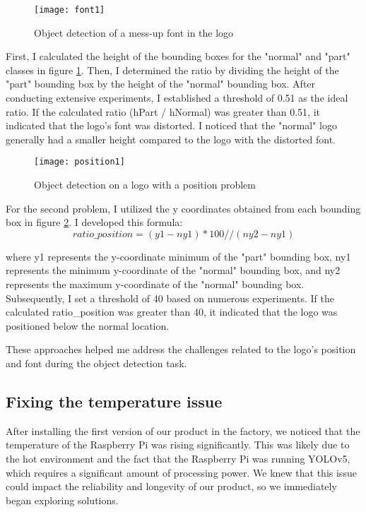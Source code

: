 \begin{figure}[htbp]
    \centering
    
    \begin{minipage}{1\textwidth}
        \centering
        \texttt{[image: font1]}
        \caption{Object detection of a mess-up font in the logo}
        \label{fig:image4}
    \end{minipage}
\end{figure}
\FloatBarrier 
 First, I calculated the height of the bounding boxes for the "normal" and "part" classes in figure \ref{fig:image4}. Then, I determined the ratio by dividing the height of the "part" bounding box by the height of the "normal" bounding box. After conducting extensive experiments, I established a threshold of 0.51 as the ideal ratio. If the calculated ratio (hPart / hNormal) was greater than 0.51, it indicated that the logo's font was distorted. I noticed that the "normal" logo generally had a smaller height compared to the logo with the distorted font.
\FloatBarrier
\begin{figure}[htbp]
    \centering
    
    \begin{minipage}{1\textwidth}
        \centering
        \texttt{[image: position1]}
        \caption{Object detection on a logo with a position problem}
        \label{fig:image5}
    \end{minipage}
\end{figure}
\FloatBarrier
For the second problem, I utilized the y coordinates obtained from each bounding box  in figure \ref{fig:image5}. I developed this formula:
\begin{equation}
ratio\_position = (y1 - ny1) * 100 // (ny2 - ny1)
\end{equation}

 where y1 represents the y-coordinate minimum of the "part" bounding box, ny1 represents the minimum y-coordinate of the "normal" bounding box, and ny2 represents the maximum y-coordinate of the "normal" bounding box. Subsequently, I set a threshold of 40 based on numerous experiments. If the calculated ratio\_position was greater than 40, it indicated that the logo was positioned below the normal location.

These approaches helped me address the challenges related to the logo's position and font during the object detection task.
\subsection{Fixing the temperature issue}
After installing the first version of our product in the factory, we noticed that the temperature of the Raspberry Pi was rising significantly. This was likely due to the hot environment and the fact that the Raspberry Pi was running YOLOv5, which requires a significant amount of processing power. We knew that this issue could impact the reliability and longevity of our product, so we immediately began exploring solutions.

